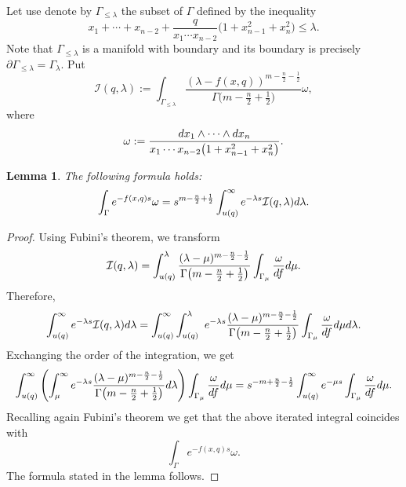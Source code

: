 \documentclass[10pt,a4paper]{article}
\numberwithin{equation}{section}
\newtheorem{Lemma}[Theorem]{Lemma}
\begin{document}
Let use denote by $\Gamma_{\leq \lambda}$ the subset of $\Gamma$ defined by
the inequality
\[
x_1+\cdots + x_{n-2} +
\frac{q}{x_1\cdots x_{n-2}}
\big(1+x_{n-1}^2+x_n^2\big) \leq \lambda.
\]
Note that $\Gamma_{\leq \lambda}$ is a manifold with boundary and its
boundary is precisely $\partial \Gamma_{\leq
 \lambda}=\Gamma_\lambda$. Put
\[
\mathcal{I}(q,\lambda) :=
\int_{\Gamma_{\leq \lambda}} \frac{
(\lambda-f(x,q))^{m-\frac{n}{2}-\frac{1}{2}} }{
\Gamma\big( m-\frac{n}{2}+\frac{1}{2} \big) }
\omega,
\]
where
\[
\omega:= \frac{{\rm d}x_1\wedge \cdots \wedge {\rm d}x_n}{
x_1\cdots x_{n-2}\big(1+x_{n-1}^2+ x_n^2\big) }.
\]
\begin{Lemma}\label{le:Lapl_I}
The following formula holds:
\[
\int_\Gamma e^{-f(x,q) s} \omega=
s^{m-\frac{n}{2}+\frac{1}{2}}
\int_{u(q)}^\infty e^{-\lambda s} \mathcal{I}(q,\lambda) {\rm d}\lambda.
\]
\end{Lemma}
\begin{proof}
Using Fubini's theorem, we transform
\[
\mathcal{I}(q,\lambda) = \int_{u(q)}^\lambda
\frac{(\lambda-\mu)^{m-\frac{n}{2}-\frac{1}{2}} }{
\Gamma\big(m-\frac{n}{2}+\frac{1}{2}\big) }
\int_{\Gamma_\mu} \frac{\omega}{{\rm d}f} {\rm d}\mu.
\]
Therefore,
\[
\int_{u(q)}^\infty e^{-\lambda s} \mathcal{I}(q,\lambda) {\rm d}\lambda =
\int_{u(q)}^\infty
\int_{u(q)}^\lambda \ e^{-\lambda s}
\frac{(\lambda-\mu)^{m-\frac{n}{2}-\frac{1}{2}} }{
\Gamma\big(m-\frac{n}{2}+\frac{1}{2}\big) }
\int_{\Gamma_\mu} \frac{\omega}{{\rm d}f} {\rm d}\mu {\rm d}\lambda.
\]
Exchanging the order of the integration, we get
\[
\int_{u(q)}^\infty
\left(
\int_\mu^\infty
e^{-\lambda s}
\frac{(\lambda-\mu)^{m-\frac{n}{2}-\frac{1}{2}} }{
\Gamma\big(m-\frac{n}{2}+\frac{1}{2}\big) } {\rm d}\lambda \right)
\int_{\Gamma_\mu} \frac{\omega}{{\rm d}f} {\rm d}\mu =
s^{-m+\frac{n}{2} -\frac{1}{2}}
\int_{u(q)}^\infty
e^{-\mu s}
\int_{\Gamma_\mu} \frac{\omega}{{\rm d}f} {\rm d}\mu.
\]
Recalling again Fubini's theorem we get that the above iterated
integral coincides with \[\int_\Gamma e^{-f(x,q) s} \omega.\] The
formula stated in the lemma follows.
\end{proof}
\end{document}
